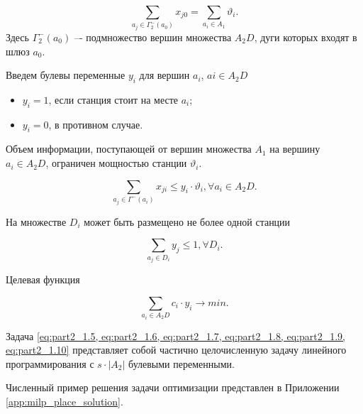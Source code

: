 \begin{equation}\label{eq:part2_1.7}
    \sum_{a_j \in \Gamma_2^-(a_0)} x_{j0} = \sum_{a_i \in A_1} \vartheta_i.
\end{equation}
Здесь $\Gamma_2^-(a_0)$ –- подмножество вершин множества $A_2D$, дуги которых входят в шлюз $a_0$.

Введем булевы переменные $y_i$ для вершин $a_i$, $ai \in A_2D$
\begin{itemize}
    \item $y_i = 1$, если станция стоит на месте $a_i$;
    \item $y_i = 0$, в противном случае.
\end{itemize}

Объем информации, поступающей от вершин множества $A_1$ на вершину $a_i \in A_2D$, ограничен мощностью станции $\vartheta_i$.

\begin{equation}\label{eq:part2_1.8}
    \sum_{a_j \in \Gamma^-(a_i)} x_{ji} \leqslant y_i \cdot \vartheta_i, \forall a_i \in A_2D.
\end{equation}

На множестве $D_i$ может быть размещено не более одной станции 


\begin{equation}\label{eq:part2_1.9}
    \sum_{a_j \in D_i} y_j \leqslant 1, \forall D_i.
\end{equation}

Целевая функция

\begin{equation}\label{eq:part2_1.10}
    \sum_{a_i \in A_2D} c_i \cdot y_i \to min.
\end{equation}

Задача \cref{eq:part2_1.5, eq:part2_1.6, eq:part2_1.7, eq:part2_1.8, eq:part2_1.9, eq:part2_1.10} представляет собой частично целочисленную задачу линейного программирования с $s \cdot |A_2|$ булевыми переменными.

Численный пример решения задачи оптимизации представлен в Приложении \cref{app:milp_place_solution}.


